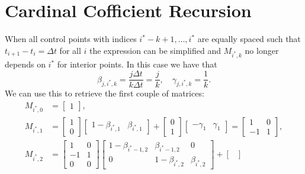 \section{Cardinal Cofficient Recursion}

When all control points with indices $i^* - k + 1, \ldots, i^*$ are equally spaced such that $t_{i+1} - t_i = \Delta t$ for all $i$ the expression can be simplified and $M_{i^*, k}$ no longer depends on $i^*$ for interior points. In this case we have that
\begin{equation}
  \beta_{j, i^*, k} = \frac{j \Delta t} {k \Delta t} = \frac{j}{k}, \quad \gamma_{j, i^*, k} = \frac{1}{k}.
\end{equation}
We can use this to retrieve the first couple of matrices:
\begin{subequations}
  \begin{align}
    M_{i^*, 0} & = \begin{bmatrix} 1 \end{bmatrix},                                                                                                                             \\
    M_{i^*, 1} & = \begin{bmatrix} 1 \\ 0 \end{bmatrix} \begin{bmatrix}
      1 - \beta_{i^*, 1} & \beta_{i^*, 1}
    \end{bmatrix} + \begin{bmatrix} 0 \\ 1 \end{bmatrix} \begin{bmatrix}
      - \gamma_{1} & \gamma_{1}
    \end{bmatrix} = \begin{bmatrix} 1 & 0 \\ -1 & 1 \end{bmatrix},             \\
    M_{i^*, 2} & = \begin{bmatrix}
      1 & 0 \\ -1 & 1 \\ 0 & 0
    \end{bmatrix} \begin{bmatrix}
      1 - \beta_{i^* - 1, 2} & \beta_{i^* - 1, 2} & 0              \\
      0                      & 1 - \beta_{i^*, 2} & \beta_{i^*, 2}
    \end{bmatrix} + \begin{bmatrix}

\end{bmatrix}
\end{align}
\end{subequations}
